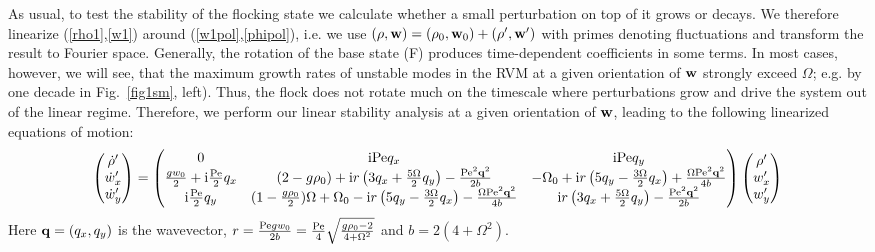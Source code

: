\documentclass[aps,twocolumn,showlabels,showrefs,amsmath,amssymb,pre,superscriptaddress, floatfix, colors]{revtex4}
\newcommand{\1}{\begin{equation}}
\newcommand{\2}{\end{equation}}
\newcommand{\ea}{\begin{eqnarray}}
\newcommand{\ee}{\end{eqnarray}}
\newcommand{\4}[2]{{\frac{#1}{#2}}}
\newcommand{\I}{{ {\rm i}  }}
\begin{document}
As usual, to test the stability of the flocking state we calculate whether a small perturbation on top of it 
grows or decays.
We therefore linearize (\ref{rho1},\ref{w1})
around (\ref{w1pol},\ref{phipol}), i.e. we use
$(\rho, {\bf w})=(\rho_0,{\bf w}_0)+(\rho',{\bf w}')$ 
with primes denoting fluctuations and transform the result to Fourier space. 
Generally, the rotation of the base state (F) produces time-dependent coefficients in some terms. 
In most cases, however, we will see, that the maximum growth rates of unstable modes in the RVM at a given orientation of ${\bf w}$ strongly exceed $\Omega$; e.g. by one decade in Fig.~\ref{fig1sm}, left).
Thus, the flock does not rotate much on the timescale where perturbations grow and drive the system out of the linear regime. 
Therefore, we perform our linear stability analysis at a given orientation of ${\bf w}$, 
leading to the following linearized equations of motion:
\ea
\left(\begin{matrix} \dot \rho' \\ \dot w'_x \\ \dot w'_y \end{matrix}\right) = 
\left(\begin{matrix}
0 & \I {\rm Pe} q_x & \I {\rm Pe} q_y \\
\4{g w_0}{2} + \I \4{{\rm Pe}}{2}q_x & (2-g \rho_0) + \I r \left(3q_x+\4{5\Omega}{2}q_y\right) -\4{{\rm Pe}^2 {\bf q}^2}{2b}& -\Omega_0 + \I r \left(5q_y-\4{3\Omega}{2}q_x\right) + \4{\Omega {\rm Pe}^2 {\bf q}^2}{4b}\\ 
\I \4{{\rm Pe}}{2}q_y & (1-\4{g\rho_0}{2})\Omega+\Omega_0 - \I r \left(5 q_y-\4{3\Omega}{2}q_x \right) -\4{\Omega {\rm Pe}^2 {\bf q}^2}{4b} &  \I r\left(3q_x + \4{5\Omega}{2}q_y\right) - \4{{\rm Pe}^2 {\bf q}^2}{2b}
\end{matrix}\right) 
\left(\begin{matrix}\rho' \\ w'_x \\ w'_y \end{matrix}\right)
\label{stabmat}
\ee
Here ${\bf q}=(q_x,q_y)$ is the wavevector, $r=\4{{\rm Pe} g w_0}{2b}=\4{{\rm Pe}}{4}\sqrt{\4{g\rho_0-2}{4+\Omega^2}}$ and $b=2(4+\Omega^2)$.
\end{document}

